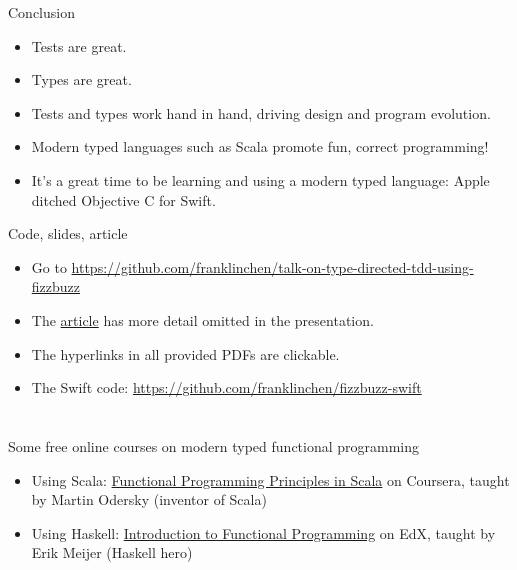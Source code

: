 \begin{frame}{Conclusion}
  \begin{itemize}
  \item \alert{Tests} are great.
  \item \alert{Types} are great.
  \item Tests and types work hand in hand, driving design and program evolution.
  \item Modern typed languages such as Scala promote fun, correct programming!
  \item It's a great time to be learning and using a modern typed language: Apple ditched Objective C for Swift.
  \end{itemize}

  \begin{block}{Code, slides, article}
    \begin{itemize}
    \item Go to  \url{https://github.com/franklinchen/talk-on-type-directed-tdd-using-fizzbuzz}
    \item The \href{https://github.com/FranklinChen/talk-on-type-directed-tdd-using-fizzbuzz/blob/master/doc/article.pdf}{article} has more detail omitted in the presentation.
    \item The hyperlinks in all provided PDFs are clickable.
    \item The Swift code: \url{https://github.com/franklinchen/fizzbuzz-swift}
    \end{itemize}
  \end{block}
\end{frame}

\appendix

\section*{\appendixname}

\begin{frame}{Some free online courses on modern typed functional programming}
  \begin{itemize}
  \item Using Scala: \href{http://www.coursera.org/course/progfun}{Functional Programming Principles in Scala} on Coursera, taught by Martin Odersky (inventor of Scala)
  \item Using Haskell: \href{http://www.edx.org/course/delftx/delftx-fp101x-introduction-functional-2126}{Introduction to Functional Programming} on EdX, taught by Erik Meijer (Haskell hero)
  \end{itemize}
\end{frame}



